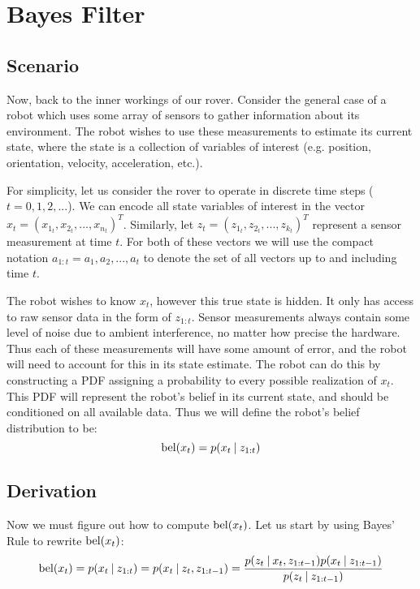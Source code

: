 \section{Bayes Filter}
\subsection{Scenario}
Now, back to the inner workings of our rover. Consider the general case of a robot which uses some array of sensors to gather information about its environment. The robot wishes to use these measurements to estimate its current state, where the state is a collection of variables of interest (e.g. position, orientation, velocity, acceleration, etc.).

For simplicity, let us consider the rover to operate in discrete time steps (\(t=0,1,2,...\)). We can encode all state variables of interest in the vector \(x_t = (x_{1_t}, x_{2_t}, ... , x_{n_t})^T\). Similarly, let \(z_t = (z_{1_t}, z_{2_t}, ... , z_{k_t})^T\) represent a sensor measurement at time \(t\). For both of these vectors we will use the compact notation \(a_{1:t} = a_1, a_2, ..., a_t\) to denote the set of all vectors up to and including time \(t\).

The robot wishes to know \(x_t\), however this true state is hidden. It only has access to raw sensor data in the form of \(z_{1:t}\). Sensor measurements always contain some level of noise due to ambient interference, no matter how precise the hardware. Thus each of these measurements will have some amount of error, and the robot will need to account for this in its state estimate. The robot can do this by constructing a PDF assigning a probability to every possible realization of \(x_t\). This PDF will represent the robot's belief in its current state, and should be conditioned on all available data. Thus we will define the robot's belief distribution to be:
\begin{equation} \label{eqBel}
\mathrm{bel}(x_t) = p(x_t \mathbin{\vert} z_{1:t})
\end{equation}

\subsection{Derivation}
Now we must figure out how to compute \(\mathrm{bel}(x_t)\). Let us start by using Bayes' Rule to rewrite \(\mathrm{bel}(x_t)\):
\begin{equation*}
\mathrm{bel}(x_t) = p(x_t \mathbin{\vert} z_{1:t}) = p(x_t \mathbin{\vert} z_t, z_{1:t-1}) = \frac{p(z_t \mathbin{\vert} x_t, z_{1:t-1})p(x_t \mathbin{\vert} z_{1:t-1})}{p(z_t \mathbin{\vert} z_{1:t-1})}
\end{equation*}


